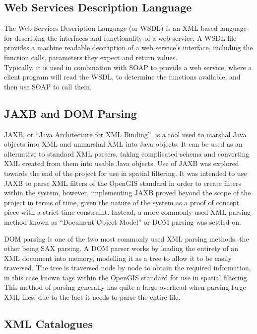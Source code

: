 \documentclass[a4paper, 12pt, twoside]{article}
\begin{document}
\subsection{Web Services Description Language}
\label{sec:bg_wsdl}

The Web Services Description Language (or WSDL) is an XML based language for describing the interfaces and functionality of a web service. A WSDL file provides a machine readable description of a web service's interface, including the function calls, parameters they expect and return values.\\
Typically, it is used in combination with SOAP to provide a web service, where a client program will read the WSDL, to determine the functions available, and then use SOAP to call them.

\subsection{JAXB and DOM Parsing}
\label{sec:bg_parsing}

JAXB, or ``Java Architecture for XML Binding'', is a tool used to marshal Java objects into XML and unmarshal XML into Java objects. It can be used as an alternative to standard XML parsers, taking complicated schema and converting XML created from them into usable Java objects. Use of JAXB was explored towards the end of the project for use in spatial filtering. It was intended to use JAXB to parse XML filters of the OpenGIS standard in order to create filters within the system, however, implementing JAXB proved beyond the scope of the project in terms of time, given the nature of the system as a proof of concept piece with a strict time constraint. Instead, a more commonly used XML parsing method known as ``Document Object Model'' or DOM parsing was settled on.

DOM parsing is one of the two most commonly used XML parsing methods, the other being SAX parsing. A DOM parser works by loading the entirety of an XML document into memory, modelling it as a tree to allow it to be easily traversed. The tree is traversed node by node to obtain the required information, in this case known tags within the OpenGIS standard for use in spatial filtering. This method of parsing generally has quite a large overhead when parsing large XML files, due to the fact it needs to parse the entire file.

\subsection{XML Catalogues}
\label{sec:bg_catalogues}
\end{document}
